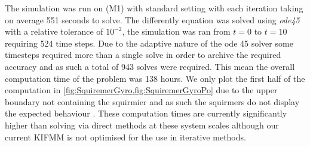 The simulation was run on (M1) with standard setting with each iteration taking on average 551 seconds to solve. The differently equation was solved using \textit{ode45} with a relative tolerance of $10^{-2}$, the simulation was ran from $t=0$ to $t=10$ requiring 524 time steps. Due to the adaptive nature of the ode 45 solver some timesteps required more than a single solve in order to archive the required accuracy and as such a total of 943 solves were required. This mean the overall computation time of the problem was 138 hours. We only plot the first half of the computation in \cref{fig:SquiremerGyro,fig:SquiremerGyroPo} due to the upper boundary not containing the squirmier and as such the squirmers do not display the expected behaviour \cite{Ruhle2020EmergentGravity}. These computation times are currently significantly higher than solving via direct methods at these system scales although our current KIFMM is not optimised for the use in iterative methods.  

